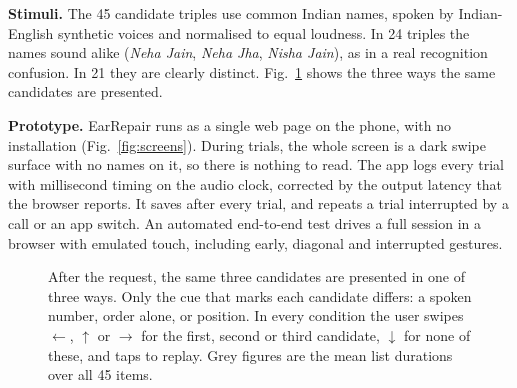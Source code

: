 \documentclass[conference,letterpaper]{IEEEtran}
\begin{document}
\textbf{Stimuli.} The 45 candidate triples use common Indian names, spoken by Indian-English synthetic
voices and normalised to equal loudness. In 24 triples the names sound alike (\emph{Neha Jain},
\emph{Neha Jha}, \emph{Nisha Jain}), as in a real recognition confusion. In 21 they are clearly distinct.
Fig.~\ref{fig:trial} shows the three ways the same candidates are presented.

\textbf{Prototype.} EarRepair runs as a single web page on the phone, with no installation
(Fig.~\ref{fig:screens}). During trials, the whole screen is a dark swipe surface with no names on it,
so there is nothing to read. The app logs every trial with millisecond timing on the audio clock,
corrected by the output latency that the browser reports. It saves after every trial, and repeats a trial
interrupted by a call or an app switch. An automated end-to-end test drives a full session in a
browser with emulated touch, including early, diagonal and interrupted gestures.

\begin{figure}[t]
\centering
\caption{After the request, the same three candidates are presented in one of three ways. Only the cue
that marks each candidate differs: a spoken number, order alone, or position. In every condition the
user swipes $\leftarrow$, $\uparrow$ or $\rightarrow$ for the first, second or third candidate,
$\downarrow$ for none of these, and taps to replay. Grey figures are the mean list durations over all
45 items.}
\label{fig:trial}
\end{figure}
\end{document}

